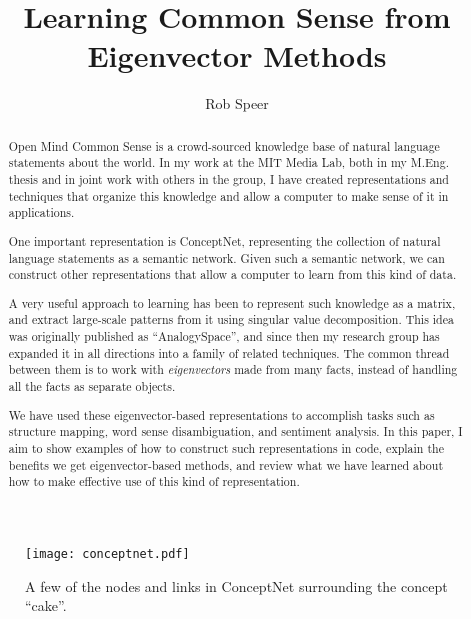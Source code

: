 \documentclass[11pt]{article}
\begin{document}
\title{Learning Common Sense from Eigenvector Methods}

\author{Rob Speer}

\maketitle

\begin{abstract}
Open Mind Common Sense is a crowd-sourced knowledge base of natural language
statements about the world. In my work at the MIT Media Lab, both in my M.Eng.
thesis and in joint work with others in the group, I have created
representations and techniques that organize this knowledge and allow a
computer to make sense of it in applications.

One important representation is ConceptNet, representing the collection of
natural language statements as a semantic network. Given such a semantic
network, we can construct other representations that allow a computer to learn
from this kind of data.

A very useful approach to learning has been to represent such knowledge
as a matrix, and extract large-scale patterns from it using singular value
decomposition. This idea was originally published as ``AnalogySpace'', and
since then my research group has expanded it in all directions into a family of
related techniques. The common thread between them is to work with {\em
eigenvectors} made from many facts, instead of handling all the facts as
separate objects.

We have used these eigenvector-based representations to accomplish tasks such
as structure mapping, word sense disambiguation, and sentiment analysis. In
this paper, I aim to show examples of how to construct such representations in
code, explain the benefits we get eigenvector-based methods, and review what we
have learned about how to make effective use of this kind of representation.

\end{abstract}

\tableofcontents
\vspace{3in}

\begin{figure}[h]
\begin{center}
\texttt{[image: conceptnet.pdf]}
\end{center}
\vspace{-2em}
\caption{A few of the nodes and links in ConceptNet surrounding the concept ``cake''.}
\label{fig:conceptnet}
\end{figure}
\end{document}

